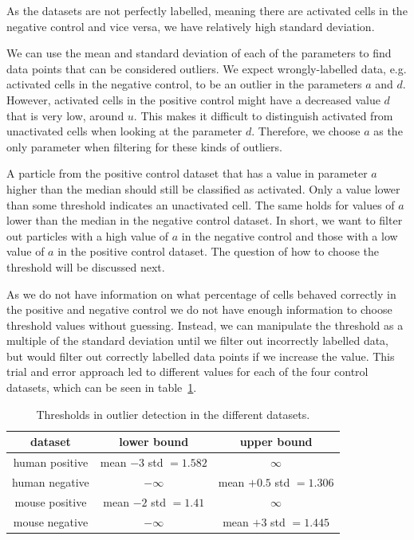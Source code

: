As the datasets are not perfectly labelled, meaning there are activated cells in the negative control and vice versa, we have relatively high standard deviation.

We can use the mean and standard deviation of each of the parameters to find data points that can be considered outliers. We expect wrongly-labelled data, e.g. activated cells in the negative control, to be an outlier in the parameters $a$ and $d$. However, activated cells in the positive control might have a decreased value $d$ that is very low, around $u$. This makes it difficult to distinguish activated from unactivated cells when looking at the parameter $d$. Therefore, we choose $a$ as the only parameter when filtering for these kinds of outliers.

A particle from the positive control dataset that has a value in parameter $a$ higher than the median should still be classified as activated. Only a value lower than some threshold indicates an unactivated cell. The same holds for values of $a$ lower than the median in the negative control dataset. In short, we want to filter out particles with a high value of $a$ in the negative control and those with a low value of $a$ in the positive control dataset. The question of how to choose the threshold will be discussed next.

As we do not have information on what percentage of cells behaved correctly in the positive and negative control we do not have enough information to choose threshold values without guessing. Instead, we can manipulate the threshold as a multiple of the standard deviation until we filter out incorrectly labelled data, but would filter out correctly labelled data points if we increase the value. This trial and error approach led to different values for each of the four control datasets, which can be seen in table~\ref{tab:threshold_outlier}.

\begin{table}[h!]
	\centering
	\begin{tabular}{|c|c|c|}
		\hline
		dataset & lower bound & upper bound \\
		\hline
		human positive & mean $ - 3$ std $ = 1.582$ & $\infty$ \\
		\hline
		human negative & $-\infty$ & mean $ + 0.5$ std $ = 1.306$ \\
		\hline
		mouse positive & mean $ - 2$ std $ = 1.41$ & $\infty$ \\
		\hline
		mouse negative & $-\infty$ & mean $ + 3$ std $ = 1.445$ \\
		\hline
	\end{tabular}
	\caption{Thresholds in outlier detection in the different datasets.}
	\label{tab:threshold_outlier}
\end{table}

